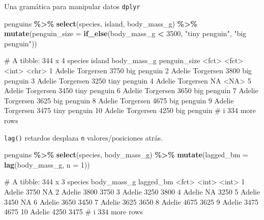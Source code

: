\documentclass[
  ignorenonframetext,
  aspectratio=169]{beamer}
\newenvironment{Shaded}{\begin{snugshade}}{\end{snugshade}}
\newcommand{\AttributeTok}[1]{\textcolor[rgb]{0.13,0.29,0.53}{#1}}
\newcommand{\DecValTok}[1]{\textcolor[rgb]{0.00,0.00,0.81}{#1}}
\newcommand{\FunctionTok}[1]{\textcolor[rgb]{0.13,0.29,0.53}{\textbf{#1}}}
\newcommand{\NormalTok}[1]{#1}
\newcommand{\SpecialCharTok}[1]{\textcolor[rgb]{0.81,0.36,0.00}{\textbf{#1}}}
\newcommand{\StringTok}[1]{\textcolor[rgb]{0.31,0.60,0.02}{#1}}
\let\oldverbatim\verbatim
\let\endoldverbatim\endverbatim
\renewenvironment{verbatim}{\tiny\oldverbatim}{\endoldverbatim}
\begin{document}
\begin{frame}[fragile]{Una gramática para manipular datos
\texttt{dplyr}}
\label{una-gramuxe1tica-para-manipular-datos-dplyr-18}
\begin{Shaded}
\begin{Highlighting}[]
\NormalTok{penguins }\SpecialCharTok{\%\textgreater{}\%} \FunctionTok{select}\NormalTok{(species, island, body\_mass\_g) }\SpecialCharTok{\%\textgreater{}\%} 
  \FunctionTok{mutate}\NormalTok{(}\AttributeTok{penguin\_size =} \FunctionTok{if\_else}\NormalTok{(body\_mass\_g }\SpecialCharTok{\textless{}} \DecValTok{3500}\NormalTok{, }\StringTok{"tiny penguin"}\NormalTok{, }\StringTok{"big penguin"}\NormalTok{))}
\end{Highlighting}
\end{Shaded}

\begin{verbatim}
# A tibble: 344 x 4
   species island    body_mass_g penguin_size
   <fct>   <fct>           <int> <chr>       
 1 Adelie  Torgersen        3750 big penguin 
 2 Adelie  Torgersen        3800 big penguin 
 3 Adelie  Torgersen        3250 tiny penguin
 4 Adelie  Torgersen          NA <NA>        
 5 Adelie  Torgersen        3450 tiny penguin
 6 Adelie  Torgersen        3650 big penguin 
 7 Adelie  Torgersen        3625 big penguin 
 8 Adelie  Torgersen        4675 big penguin 
 9 Adelie  Torgersen        3475 tiny penguin
10 Adelie  Torgersen        4250 big penguin 
# i 334 more rows
\end{verbatim}

\texttt{lag()} retardos desplaza \texttt{n} valores/posiciones atrás.

\begin{Shaded}
\begin{Highlighting}[]
\NormalTok{penguins }\SpecialCharTok{\%\textgreater{}\%} \FunctionTok{select}\NormalTok{(species, body\_mass\_g) }\SpecialCharTok{\%\textgreater{}\%} 
  \FunctionTok{mutate}\NormalTok{(}\AttributeTok{lagged\_bm =} \FunctionTok{lag}\NormalTok{(body\_mass\_g, }\AttributeTok{n =} \DecValTok{1}\NormalTok{))}
\end{Highlighting}
\end{Shaded}

\begin{verbatim}
# A tibble: 344 x 3
   species body_mass_g lagged_bm
   <fct>         <int>     <int>
 1 Adelie         3750        NA
 2 Adelie         3800      3750
 3 Adelie         3250      3800
 4 Adelie           NA      3250
 5 Adelie         3450        NA
 6 Adelie         3650      3450
 7 Adelie         3625      3650
 8 Adelie         4675      3625
 9 Adelie         3475      4675
10 Adelie         4250      3475
# i 334 more rows
\end{verbatim}


\end{frame}
\end{document}
